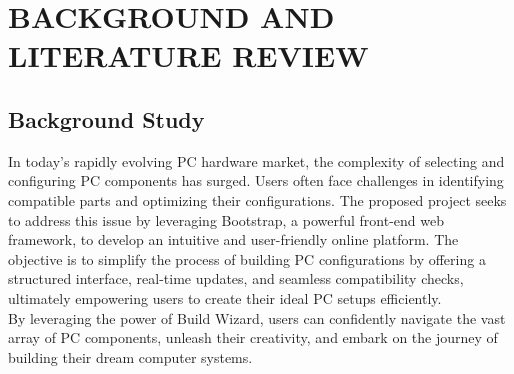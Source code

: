 \chapter{BACKGROUND AND LITERATURE REVIEW}





\section{Background Study}
In today's rapidly evolving PC hardware market, the complexity of selecting and configuring PC components has surged. Users often face challenges in identifying compatible parts and optimizing their configurations. The proposed project seeks to address this issue by leveraging Bootstrap, a powerful front-end web framework, to develop an intuitive and user-friendly online platform. The objective is to simplify the process of building PC configurations by offering a structured interface, real-time updates, and seamless compatibility checks, ultimately empowering users to create their ideal PC setups efficiently.\\
By leveraging the power of Build Wizard, users can confidently navigate the vast array of PC components, unleash their creativity, and embark on the journey of building their dream computer systems.

